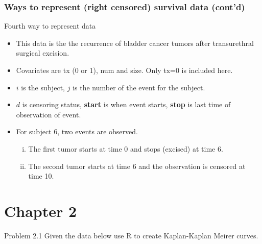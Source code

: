 \documentclass{beamer}
\theoremstyle{definition}
\begin{document}
\begin{frame}
\frametitle{Ways to represent (right censored) survival data (cont'd)}
\begin{block}{Fourth way to represent data }
\begin{itemize}
\item This data is the the recurrence of bladder cancer tumors after transurethral surgical excision. 
\item Covariates are tx (0 or 1), num and size. Only tx=0 is included here. 
\item $i$ is the subject, $j$ is the number of the event for the subject.
\item $d$ is censoring status, \textbf{start} is when event starts, \textbf{stop} is last time of observation of event. 
\item For subject 6, two events are observed. 
\begin{enumerate}[i.]
\item The first tumor starts at time 0 and stops (excised) at time 6.
\item The second tumor starts at time 6 and the observation is censored at time 10. 
\end{enumerate}
\end{itemize} 
\end{block}
\end{frame} 


\section{Chapter 2}
\begin{frame}
\begin{block}{Problem 2.1}
Given the data below use R to create Kaplan-Kaplan Meirer curves.
\end{block}
\end{frame}
\end{document}
